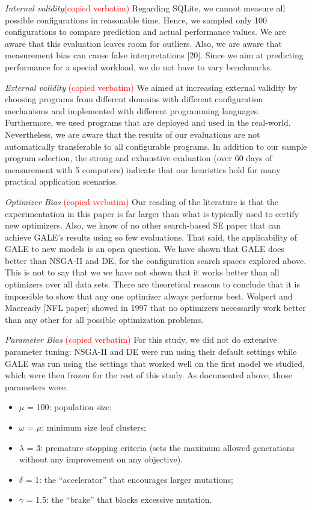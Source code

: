 \documentclass{sig-alternative}
\begin{document}
{\em Internal validity}\textcolor{red}{(copied verbatim)}
Regarding SQLite, we cannot measure all possible configurations in reasonable time. Hence, we sampled only 100 configurations to compare prediction and actual performance values. We are aware that this evaluation leaves room for outliers.
Also, we are aware that measurement bias can cause false interpretations [20]. Since we aim at predicting performance for a special workload, we do not have to vary benchmarks.



{\em External validity} \textcolor{red}{(copied verbatim)} We aimed at increasing external validity by choosing programs from different domains with different configuration mechanisms and implemented with different programming languages. Furthermore, we used programs that are deployed and used in the real-world. Nevertheless, we are aware that the results of our evaluations are not automatically transferable to all configurable programs. In addition to our sample program selection, the strong and exhaustive evaluation (over 60 days of measurement with 5 computers) indicate that our heuristics hold for many practical application scenarios.

{\em Optimizer Bias} \textcolor{red}{(copied verbatim)}
Our reading of the literature is that the experimentation
in this paper is far larger than what is typically used
to certify new optimizers. Also, we know of no other
search-based SE paper that can achieve GALE’s results
using so few evaluations.
That said, the applicability of GALE to new models
is an open question. We have shown that GALE does
better than NSGA-II and DE, for the configuration search spaces explored
above. This is not to say that we we have not shown that
it works better than all optimizers over all data sets.
There are theoretical reasons to conclude that it is impossible
to show that any one optimizer always performs
best. Wolpert and Macready [NFL paper] showed in 1997 that no
optimizers necessarily work better than any other for all possible optimization problems.

{\em Parameter Bias} \textcolor{red}{(copied verbatim)}
For this study, we did not do extensive parameter tuning:
NSGA-II and DE were run using their default
settings while GALE was run using the settings that
worked well on the first model we studied, which were
then frozen for the rest of this study. As documented
above, those parameters were:
\begin{itemize}
\item $\mu$ = 100: population size;
\item $\omega$ = $\mu$: minimum size leaf clusters;
\item $\lambda$ = 3: premature stopping criteria (sets the maximum
allowed generations without any improvement
on any objective).
\item $\delta$ = 1: the ``accelerator'' that encourages larger
mutations;
\item $\gamma$ = 1.5: the ``brake'' that blocks excessive mutation.
\end{itemize}
\end{document}
